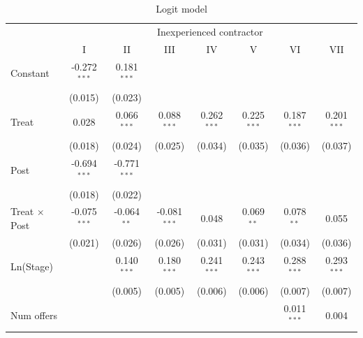\documentclass[
]{article}
\begin{document}
\begin{table}[htbp]
   \caption{Logit model}
   \centering
   \small
   \begin{tabular}{lccccccc}
      \toprule
       & \multicolumn{7}{c}{Inexperienced contractor}\\
                                          & I              & II             & III            & IV            & V             & VI            & VII\\  
      Constant                            & -0.272$^{***}$ & 0.181$^{***}$  &                &               &               &               &   \\   
                                          & (0.015)        & (0.023)        &                &               &               &               &   \\   
      Treat                               & 0.028          & 0.066$^{***}$  & 0.088$^{***}$  & 0.262$^{***}$ & 0.225$^{***}$ & 0.187$^{***}$ & 0.201$^{***}$\\   
                                          & (0.018)        & (0.024)        & (0.025)        & (0.034)       & (0.035)       & (0.036)       & (0.037)\\   
      Post                                & -0.694$^{***}$ & -0.771$^{***}$ &                &               &               &               &   \\   
                                          & (0.018)        & (0.022)        &                &               &               &               &   \\   
      Treat $\times$ Post                 & -0.075$^{***}$ & -0.064$^{**}$  & -0.081$^{***}$ & 0.048         & 0.069$^{**}$  & 0.078$^{**}$  & 0.055\\   
                                          & (0.021)        & (0.026)        & (0.026)        & (0.031)       & (0.031)       & (0.034)       & (0.036)\\   
      Ln(Stage)                           &                & 0.140$^{***}$  & 0.180$^{***}$  & 0.241$^{***}$ & 0.243$^{***}$ & 0.288$^{***}$ & 0.293$^{***}$\\   
                                          &                & (0.005)        & (0.005)        & (0.006)       & (0.006)       & (0.007)       & (0.007)\\   
      Num offers                          &                &                &                &               &               & 0.011$^{***}$ & 0.004\\   

\end{tabular}
\end{table}
\end{document}
